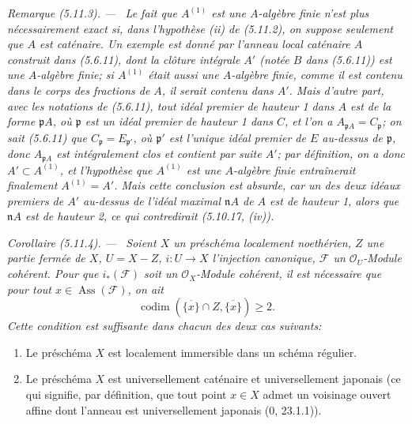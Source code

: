 \documentclass[10pt,oneside]{book}
\makeatletter
\newenvironment{corollary}[1][]{%
  \par\medskip\noindent\itshape Corollaire (#1). ---\ }{\par}
\newenvironment{remark}[1][]{%
  \par\medskip\noindent\itshape Remarque (#1). ---\ }{\par}
\newcommand{\EGAReaderTarget}[2]{\hypertarget{#1}{}\@bsphack\begingroup\def\@currentHref{#1}\label{#2}\endgroup\@esphack}
\makeatother
\begin{document}
\begin{remark}[5.11.3]
\label{IV.2.s5.11.3-fr}
Le fait que $A^{(1)}$ est une $A$-algèbre finie n'est plus nécessairement exact
si, dans l'hypothèse (ii) de (5.11.2), on suppose seulement que $A$ est
caténaire. Un exemple est donné par l'anneau local caténaire $A$ construit dans
(5.6.11), dont la clôture intégrale $A'$ (notée $B$ dans (5.6.11)) est une
$A$-algèbre finie; si $A^{(1)}$ était aussi une $A$-algèbre finie, comme il est
contenu dans le corps des fractions de $A$, il serait contenu dans $A'$. Mais
d'autre part, avec les notations de (5.6.11), tout idéal premier de hauteur 1
dans $A$ est de la forme $\mathfrak pA$, où $\mathfrak p$ est un idéal premier
de hauteur 1 dans $C$, et l'on a
$A_{\mathfrak pA}=C_\mathfrak p$; on sait (5.6.11) que
$C_\mathfrak p=E_{\mathfrak p'}$, où $\mathfrak p'$ est l'unique idéal
premier de $E$ au-dessus de $\mathfrak p$, donc $A_{\mathfrak pA}$ est
intégralement clos et contient par suite $A'$; par définition, on a donc
$A'\subset A^{(1)}$, et l'hypothèse que $A^{(1)}$ est une $A$-algèbre finie
entraînerait finalement $A^{(1)}=A'$. Mais cette conclusion est absurde, car un
des deux idéaux premiers de $A'$ au-dessus de l'idéal maximal $\mathfrak nA$ de
$A$ est de hauteur 1, alors que $\mathfrak nA$ est de hauteur 2, ce qui
contredirait (5.10.17, (iv)).
\end{remark}

\begin{corollary}[5.11.4]
\EGAReaderTarget{ega4.c04.cor.5-11-4}{IV.2.s5.11.4-fr}
Soient $X$ un préschéma localement noethérien, $Z$ une partie fermée de $X$,
$U=X-Z$, $i:U\to X$ l'injection canonique, $\mathcal F$ un
$\mathcal O_U$-Module cohérent. Pour que $i_*(\mathcal F)$ soit un
$\mathcal O_X$-Module cohérent, il est nécessaire que pour tout
$x\in\operatorname{Ass}(\mathcal F)$, on ait
\[
\operatorname{codim}(\overline{\{x\}}\cap Z,\overline{\{x\}})\geq2.
\]
Cette condition est suffisante dans chacun des deux cas suivants:
\begin{enumerate}
\item[(i)] Le préschéma $X$ est localement immersible dans un schéma régulier.
\item[(ii)] Le préschéma $X$ est universellement caténaire et universellement
japonais (ce qui signifie, par définition, que tout point $x\in X$ admet un
voisinage ouvert affine dont l'anneau est universellement japonais (0,
23.1.1)).
\end{enumerate}
\end{corollary}
\end{document}
